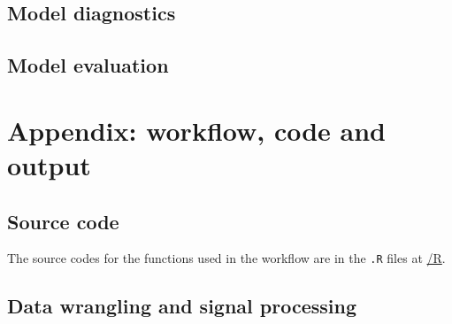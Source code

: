 \documentclass[
]{article}
\begin{document}
\hypertarget{model-diagnostics}{%
\subsection{Model diagnostics}\label{model-diagnostics}}

\hypertarget{model-evaluation}{%
\subsection{Model evaluation}\label{model-evaluation}}

\newpage

\hypertarget{appendix-workflow-code-and-output}{%
\section{Appendix: workflow, code and
output}\label{appendix-workflow-code-and-output}}

\hypertarget{source-code}{%
\subsection{Source code}\label{source-code}}

The source codes for the functions used in the workflow are in the
\texttt{.R} files at
\href{https://github.com/szmsu2011/comp90072/blob/main/R}{/R}.

\hypertarget{data-wrangling-and-signal-processing}{%
\subsection{Data wrangling and signal
processing}\label{data-wrangling-and-signal-processing}}
\end{document}
